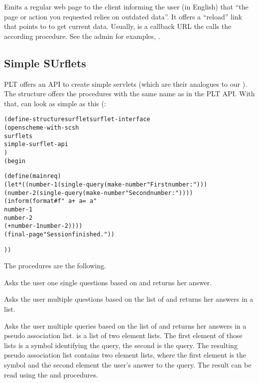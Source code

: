 \begin{desc}
  Emits a regular web page to the client informing the user (in
  English) that ``the page or action you requested relies on outdated
  data''.  It offers a ``reload'' link that points to  to get
  current data.  Usually,  is a callback URL the calls the
  according procedure.  See the admin \surflets for examples, \eg
  . 
\end{desc}


\subsection{Simple SUrflets}

PLT offers an API to create simple servlets (which are their analogues
  to our \surflets).  The  structure offers
  the procedures with the same name as in the PLT API.  With that,
  \surflets can look as simple as this
  (:

\begin{alltt}
(define-structure surflet surflet-interface
  (open scheme-with-scsh
        surflets
        simple-surflet-api
        )
  (begin

    (define (main req)
      (let* ((number-1 (single-query (make-number "First number:")))
             (number-2 (single-query (make-number "Second number:"))))
        (inform (format #f "~a + ~a = ~a"
                        number-1
                        number-2
                        (+ number-1 number-2))))
      (final-page "Session finished."))

))
\end{alltt}

The procedures are the following.

\begin{desc}
  Asks the user one single questions based on  and returns
  her answer.
\end{desc}

\begin{desc}
  Asks the user multiple questions based on the list of 
  and returns her answers in a list.
\end{desc}

\begin{desc}
  Asks the user multiple queries based on the list of
   and returns her answers in a pseudo association
  list.   is a list of two element lists.  The
  first element of those lists is a symbol identifying the query, the
  second is the query.  The resulting pseudo association list contains
  two element lists, where the first element is the symbol and the
  second element the user's answer to the query.  The result can be
  read using the  and  procedures.
\end{desc}

